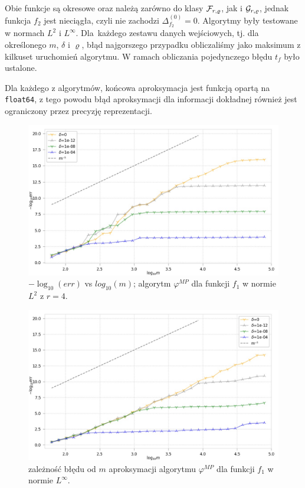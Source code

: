 \documentclass[oik, pdftex, man]{mgrwms}
\begin{document}
    Obie funkcje są okresowe oraz należą zarówno do klasy $\mathcal{F}_{r, \varrho}$, jak i $\mathcal{G}_{r,\varrho}$, jednak funkcja $f_{2}$ jest nieciągła, czyli nie zachodzi $\Delta_{f_{2}}^{(0)} = 0$. Algorytmy były testowane w normach $L^{2}$ i $L^{\infty}$. Dla~każdego zestawu danych wejściowych, tj. dla określonego $m$, $\delta$ i $\varrho$, błąd najgorszego przypadku obliczaliśmy jako maksimum z kilkuset uruchomień algorytmu. W ramach obliczania pojedynczego błędu $t_{f}$ było ustalone.

    Dla każdego z algorytmów, końcowa aproksymacja jest funkcją opartą na \verb+float64+, z tego powodu błąd aproksymacji dla informacji dokładnej również jest ograniczony przez precyzję reprezentacji.

    \begin{figure}
        \centering
        \includegraphics[width=.9\linewidth]{alg2015/Example4/r_4/p_2/plot_30evaluation_0.jpg}
        \caption{$-\log_{10}(err)$ vs $log_{10}(m)$; algorytm $\varphi^{MP}$ dla funkcji $f_{1}$ w normie $L^{2}$ z $r=4$.}
        \label{rys:1:algMP_p2}
    \end{figure}

    \begin{figure}
        \centering
        \includegraphics[width=.9\linewidth]{alg2015/Example4/r_4/p_infinity/plot_30evaluation_0.jpg}
        \caption{zależność błędu od $m$ aproksymacji algorytmu $\varphi^{MP}$ dla funkcji $f_{1}$ w normie $L^{\infty}$.}
        \label{rys:2:algMP_pInf}
    \end{figure}
    
\end{document}
